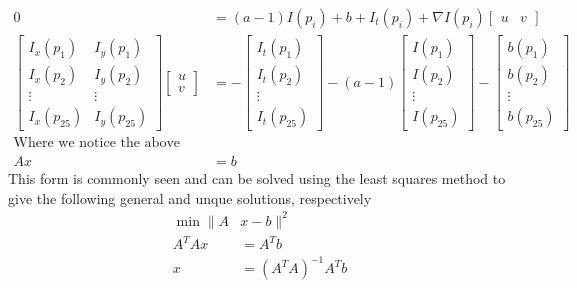 \begin{align*}
0 &= (a-1)I(p_i) + b + I_t(p_i) + \nabla I(p_i)\begin{bmatrix}u & v\end{bmatrix} \\
\begin{bmatrix} I_x(p_1) & I_y(p_1) \\ I_x(p_2) & I_y(p_2) \\ \vdots & \vdots \\ I_x(p_{25}) & I_y(p_{25}) \end{bmatrix}
\begin{bmatrix} u \\ v \end{bmatrix} &= - \begin{bmatrix} I_t(p_1) \\ I_t(p_2) \\ \vdots \\ I_t(p_{25}) \end{bmatrix}
- (a-1) \begin{bmatrix} I(p_1) \\ I(p_2) \\ \vdots \\ I(p_{25}) \end{bmatrix} - \begin{bmatrix} b(p_1) \\ b(p_2) \\ \vdots \\ b(p_{25}) \end{bmatrix} \\
\text{Where we notice the above equation takes the form}\\
A x &= b
\end{align*}
This form is commonly seen and can be solved using the least squares method to give the following general and unque solutions, respectively
\begin{align*}
\min \lVert A&x - b \rVert^2 \\
A^TAx &= A^Tb \\
x &= (A^TA)^{-1}A^Tb
\end{align*}
